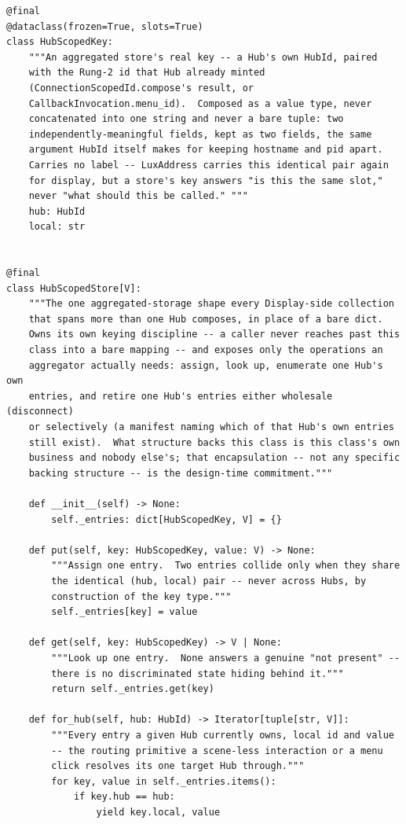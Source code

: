 \documentclass[a4paper,10pt]{article}
\begin{document}
\begin{lstlisting}
@final
@dataclass(frozen=True, slots=True)
class HubScopedKey:
    """An aggregated store's real key -- a Hub's own HubId, paired
    with the Rung-2 id that Hub already minted
    (ConnectionScopedId.compose's result, or
    CallbackInvocation.menu_id).  Composed as a value type, never
    concatenated into one string and never a bare tuple: two
    independently-meaningful fields, kept as two fields, the same
    argument HubId itself makes for keeping hostname and pid apart.
    Carries no label -- LuxAddress carries this identical pair again
    for display, but a store's key answers "is this the same slot,"
    never "what should this be called." """
    hub: HubId
    local: str


@final
class HubScopedStore[V]:
    """The one aggregated-storage shape every Display-side collection
    that spans more than one Hub composes, in place of a bare dict.
    Owns its own keying discipline -- a caller never reaches past this
    class into a bare mapping -- and exposes only the operations an
    aggregator actually needs: assign, look up, enumerate one Hub's own
    entries, and retire one Hub's entries either wholesale (disconnect)
    or selectively (a manifest naming which of that Hub's own entries
    still exist).  What structure backs this class is this class's own
    business and nobody else's; that encapsulation -- not any specific
    backing structure -- is the design-time commitment."""

    def __init__(self) -> None:
        self._entries: dict[HubScopedKey, V] = {}

    def put(self, key: HubScopedKey, value: V) -> None:
        """Assign one entry.  Two entries collide only when they share
        the identical (hub, local) pair -- never across Hubs, by
        construction of the key type."""
        self._entries[key] = value

    def get(self, key: HubScopedKey) -> V | None:
        """Look up one entry.  None answers a genuine "not present" --
        there is no discriminated state hiding behind it."""
        return self._entries.get(key)

    def for_hub(self, hub: HubId) -> Iterator[tuple[str, V]]:
        """Every entry a given Hub currently owns, local id and value
        -- the routing primitive a scene-less interaction or a menu
        click resolves its one target Hub through."""
        for key, value in self._entries.items():
            if key.hub == hub:
                yield key.local, value


\end{lstlisting}
\end{document}
